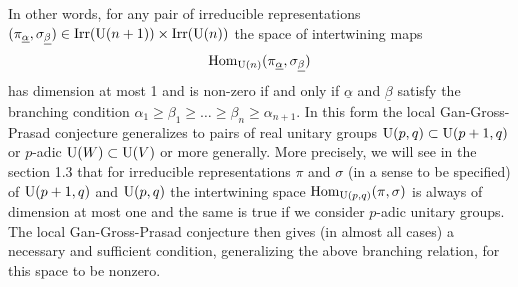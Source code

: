 In other words, for any pair of irreducible representations $(\pi_{\underline{\alpha}}, \sigma_{\underline{\beta}}) \in \mathrm{Irr}(\mathrm{U}(n+1)) \times \mathrm{Irr}(\mathrm{U}(n))$ the space of intertwining maps
\[
    \mathrm{Hom}_{\mathrm{U}(n)} (\pi_{\underline{\alpha}}, \sigma_{\underline{\beta}})
\]
has dimension at most 1 and is non-zero if and only if $\underline{\alpha}$ and $\underline{\beta}$ satisfy the branching condition $\alpha_1 \geq \beta_1 \geq \dots \geq \beta_n \geq \alpha_{n+1}$.
In this form the local Gan-Gross-Prasad conjecture generalizes to pairs of real unitary groups $\mathrm{U}(p, q) \subset \mathrm{U}(p+1, q)$ or $p$-adic $\mathrm{U}(W) \subset \mathrm{U}(V)$ or more generally.
More precisely, we will see in the section 1.3 that for irreducible representations $\pi$ and $\sigma$ (in a sense to be specified) of $\mathrm{U}(p+1, q)$ and $\mathrm{U}(p, q)$ the intertwining space $\mathrm{Hom}_{\mathrm{U}(p,q)}(\pi, \sigma)$ is always of dimension at most one and the same is true if we consider $p$-adic unitary groups.
The local Gan-Gross-Prasad conjecture then gives (in almost all cases) a necessary and sufficient condition, generalizing the above branching relation, for this space to be nonzero.

